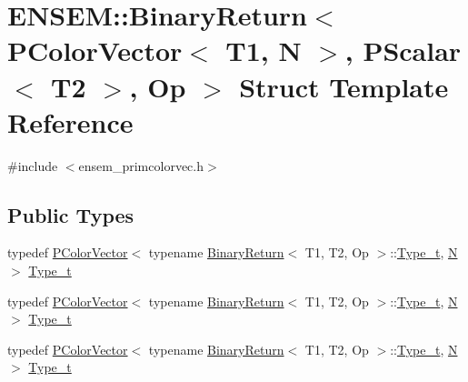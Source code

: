\hypertarget{structENSEM_1_1BinaryReturn_3_01PColorVector_3_01T1_00_01N_01_4_00_01PScalar_3_01T2_01_4_00_01Op_01_4}{}\section{E\+N\+S\+EM\+:\+:Binary\+Return$<$ P\+Color\+Vector$<$ T1, N $>$, P\+Scalar$<$ T2 $>$, Op $>$ Struct Template Reference}
\label{structENSEM_1_1BinaryReturn_3_01PColorVector_3_01T1_00_01N_01_4_00_01PScalar_3_01T2_01_4_00_01Op_01_4}


{\ttfamily \#include $<$ensem\+\_\+primcolorvec.\+h$>$}

\subsection*{Public Types}
\begin{DoxyCompactItemize}
\item 
typedef \mbox{\hyperlink{classENSEM_1_1PColorVector}{P\+Color\+Vector}}$<$ typename \mbox{\hyperlink{structENSEM_1_1BinaryReturn}{Binary\+Return}}$<$ T1, T2, Op $>$\+::\mbox{\hyperlink{structENSEM_1_1BinaryReturn_3_01PColorVector_3_01T1_00_01N_01_4_00_01PScalar_3_01T2_01_4_00_01Op_01_4_aa1c63622b6c827a70045ca780056506c}{Type\+\_\+t}}, \mbox{\hyperlink{adat__devel_2lib_2hadron_2operator__name__util_8cc_a7722c8ecbb62d99aee7ce68b1752f337}{N}} $>$ \mbox{\hyperlink{structENSEM_1_1BinaryReturn_3_01PColorVector_3_01T1_00_01N_01_4_00_01PScalar_3_01T2_01_4_00_01Op_01_4_aa1c63622b6c827a70045ca780056506c}{Type\+\_\+t}}
\item 
typedef \mbox{\hyperlink{classENSEM_1_1PColorVector}{P\+Color\+Vector}}$<$ typename \mbox{\hyperlink{structENSEM_1_1BinaryReturn}{Binary\+Return}}$<$ T1, T2, Op $>$\+::\mbox{\hyperlink{structENSEM_1_1BinaryReturn_3_01PColorVector_3_01T1_00_01N_01_4_00_01PScalar_3_01T2_01_4_00_01Op_01_4_aa1c63622b6c827a70045ca780056506c}{Type\+\_\+t}}, \mbox{\hyperlink{adat__devel_2lib_2hadron_2operator__name__util_8cc_a7722c8ecbb62d99aee7ce68b1752f337}{N}} $>$ \mbox{\hyperlink{structENSEM_1_1BinaryReturn_3_01PColorVector_3_01T1_00_01N_01_4_00_01PScalar_3_01T2_01_4_00_01Op_01_4_aa1c63622b6c827a70045ca780056506c}{Type\+\_\+t}}
\item 
typedef \mbox{\hyperlink{classENSEM_1_1PColorVector}{P\+Color\+Vector}}$<$ typename \mbox{\hyperlink{structENSEM_1_1BinaryReturn}{Binary\+Return}}$<$ T1, T2, Op $>$\+::\mbox{\hyperlink{structENSEM_1_1BinaryReturn_3_01PColorVector_3_01T1_00_01N_01_4_00_01PScalar_3_01T2_01_4_00_01Op_01_4_aa1c63622b6c827a70045ca780056506c}{Type\+\_\+t}}, \mbox{\hyperlink{adat__devel_2lib_2hadron_2operator__name__util_8cc_a7722c8ecbb62d99aee7ce68b1752f337}{N}} $>$ \mbox{\hyperlink{structENSEM_1_1BinaryReturn_3_01PColorVector_3_01T1_00_01N_01_4_00_01PScalar_3_01T2_01_4_00_01Op_01_4_aa1c63622b6c827a70045ca780056506c}{Type\+\_\+t}}
\end{DoxyCompactItemize}


